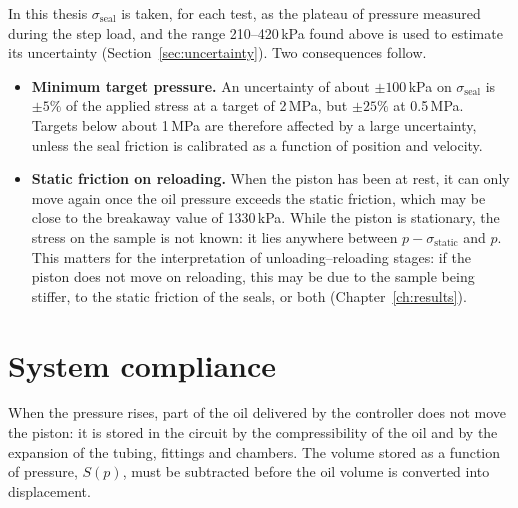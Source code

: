 In this thesis $\sigma_{\mathrm{seal}}$ is taken, for each test, as the plateau of pressure measured during the step load, and the range 210--420\,kPa found above is used to estimate its uncertainty (Section~\ref{sec:uncertainty}). Two consequences follow.
\begin{itemize}
    \item \textbf{Minimum target pressure.} An uncertainty of about $\pm100$\,kPa on $\sigma_{\mathrm{seal}}$ is $\pm5\%$ of the applied stress at a target of 2\,MPa, but $\pm25\%$ at 0.5\,MPa. Targets below about 1\,MPa are therefore affected by a large uncertainty, unless the seal friction is calibrated as a function of position and velocity.
    \item \textbf{Static friction on reloading.} When the piston has been at rest, it can only move again once the oil pressure exceeds the static friction, which may be close to the breakaway value of 1330\,kPa. While the piston is stationary, the stress on the sample is not known: it lies anywhere between $p - \sigma_{\mathrm{static}}$ and $p$. This matters for the interpretation of unloading--reloading stages: if the piston does not move on reloading, this may be due to the sample being stiffer, to the static friction of the seals, or both (Chapter~\ref{ch:results}).
\end{itemize}

\section{System compliance}
\label{sec:compliance}

When the pressure rises, part of the oil delivered by the controller does not move the piston: it is stored in the circuit by the compressibility of the oil and by the expansion of the tubing, fittings and chambers. The volume stored as a function of pressure, $S(p)$, must be subtracted before the oil volume is converted into displacement.

